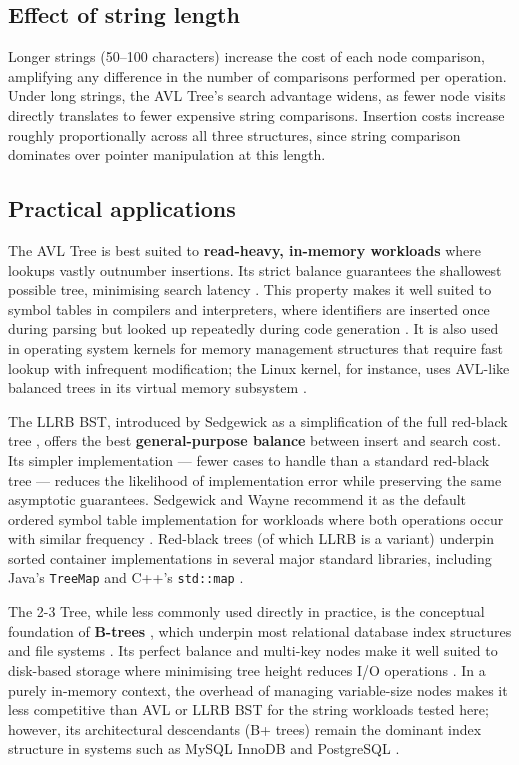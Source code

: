 \documentclass[12pt]{article}
\begin{document}
\subsection*{Effect of string length}

Longer strings (50--100 characters) increase the cost of each node comparison, amplifying any difference in the number of comparisons performed per operation. Under long strings, the AVL Tree's search advantage widens, as fewer node visits directly translates to fewer expensive string comparisons. Insertion costs increase roughly proportionally across all three structures, since string comparison dominates over pointer manipulation at this length.

\subsection*{Practical applications}

The AVL Tree is best suited to \textbf{read-heavy, in-memory workloads} where lookups vastly outnumber insertions. Its strict balance guarantees the shallowest possible tree, minimising search latency \cite{sedgewick2011}. This property makes it well suited to symbol tables in compilers and interpreters, where identifiers are inserted once during parsing but looked up repeatedly during code generation \cite{aho2006}. It is also used in operating system kernels for memory management structures that require fast lookup with infrequent modification; the Linux kernel, for instance, uses AVL-like balanced trees in its virtual memory subsystem \cite{bovet2005}.

The LLRB BST, introduced by Sedgewick as a simplification of the full red-black tree \cite{sedgewick2008}, offers the best \textbf{general-purpose balance} between insert and search cost. Its simpler implementation --- fewer cases to handle than a standard red-black tree --- reduces the likelihood of implementation error while preserving the same asymptotic guarantees. Sedgewick and Wayne recommend it as the default ordered symbol table implementation for workloads where both operations occur with similar frequency \cite{sedgewick2011}. Red-black trees (of which LLRB is a variant) underpin sorted container implementations in several major standard libraries, including Java's \texttt{TreeMap} and C++'s \texttt{std::map} \cite{cormen2022}.

The 2-3 Tree, while less commonly used directly in practice, is the conceptual foundation of \textbf{B-trees} \cite{sedgewick2011}, which underpin most relational database index structures and file systems \cite{bayer1972}. Its perfect balance and multi-key nodes make it well suited to disk-based storage where minimising tree height reduces I/O operations \cite{graefe2011}. In a purely in-memory context, the overhead of managing variable-size nodes makes it less competitive than AVL or LLRB BST for the string workloads tested here; however, its architectural descendants (B+ trees) remain the dominant index structure in systems such as MySQL InnoDB and PostgreSQL \cite{graefe2011}.
\end{document}
